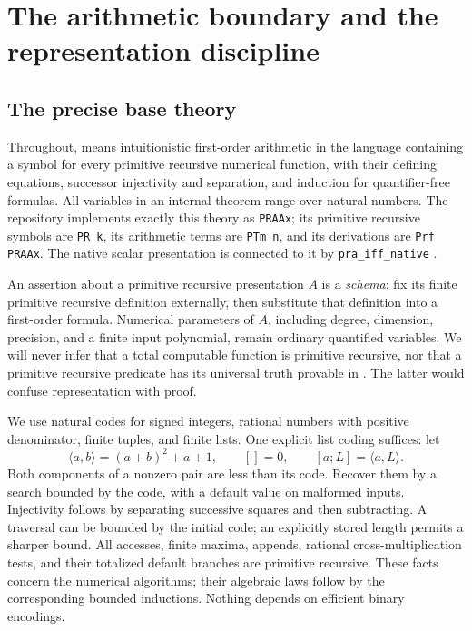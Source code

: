 \section{The arithmetic boundary and the representation discipline}
\label{sec:foundations}

\subsection{The precise base theory}

Throughout, \iPRA{} means intuitionistic first-order arithmetic in the
language containing a symbol for every primitive recursive numerical
function, with their defining equations, successor injectivity and
separation, and induction for quantifier-free formulas. All variables in
an internal theorem range over natural numbers. The repository implements
exactly this theory as \texttt{PRAAx}; its primitive recursive symbols are
\texttt{PR k}, its arithmetic terms are \texttt{PTm n}, and its derivations
are \texttt{Prf PRAAx}. The native scalar presentation is connected to it by
\texttt{pra\_iff\_native} \cite{repo-pr,repo-native}.

An assertion about a primitive recursive presentation $A$ is a
\emph{schema}: fix its finite primitive recursive definition externally,
then substitute that definition into a first-order formula. Numerical
parameters of $A$, including degree, dimension, precision, and a finite
input polynomial, remain ordinary quantified variables. We will never
infer that a total computable function is primitive recursive, nor that a
primitive recursive predicate has its universal truth provable in
\iPRA. The latter would confuse representation with proof.

We use natural codes for signed integers, rational numbers with positive
denominator, finite tuples, and finite lists. One explicit list coding
suffices: let
\[
 \langle a,b\rangle=(a+b)^2+a+1,
 \qquad []=0,\qquad [a;L]=\langle a,L\rangle.
\]
Both components of a nonzero pair are less than its code. Recover them
by a search bounded by the code, with a default value on malformed
inputs. Injectivity follows by separating successive squares and then
subtracting. A traversal can be bounded by the initial code; an explicitly
stored length permits a sharper bound. All accesses, finite maxima,
appends, rational cross-multiplication tests, and their totalized default
branches are primitive recursive. These facts concern the numerical
algorithms; their algebraic laws follow by the corresponding bounded
inductions. Nothing depends on efficient binary encodings.

